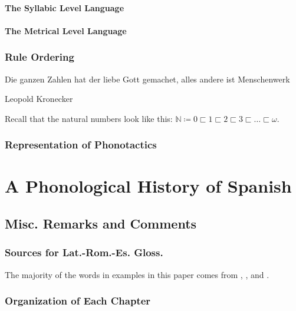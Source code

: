 \documentclass{report}[12pt]
\begin{document}
\subsection{The Syllabic Level Language}

\subsection{The Metrical Level Language}

\section{Rule Ordering}

\epigraph{Die ganzen Zahlen hat der liebe Gott gemachet, alles andere ist Menschenwerk}{Leopold Kronecker}

Recall that the natural numbers look like this: $\mathbb{N} \coloneq 0 \sqsubset 1 \sqsubset 2 \sqsubset 3 \sqsubset \dots \sqsubset \omega$.

\section{Representation of Phonotactics}

\part{A Phonological History of Spanish}

\chapter{Misc. Remarks and Comments}

\section{Sources for Lat.-Rom.-Es. Gloss.}

The majority of the words in examples in this paper comes from \cite{romance_his}, \cite{lloyd_spanish}, and \cite{penny_spanish}. 

\section{Organization of Each Chapter}

\pagebreak
\end{document}
